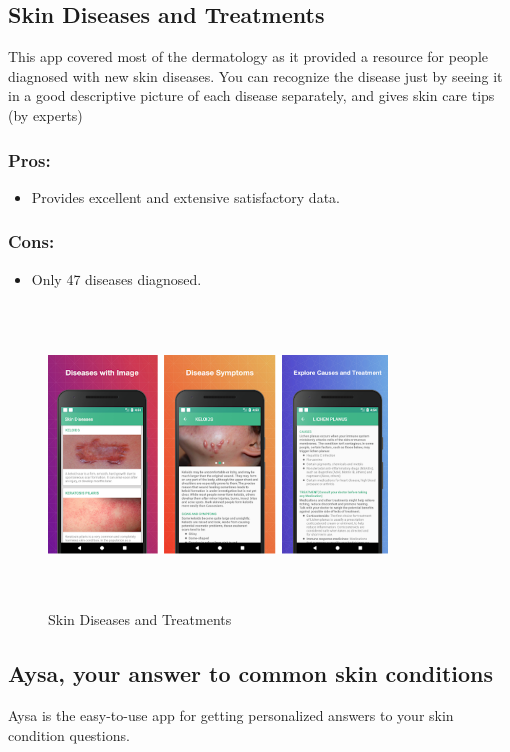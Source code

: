\subsection{Skin Diseases and Treatments}
This app covered most of the dermatology as it provided a resource for people diagnosed with new skin diseases. You can recognize the disease just by seeing it in a good descriptive picture of each disease separately, and gives skin care tips (by experts)
 \subsubsection{Pros:}
 \begin{itemize}
     \item Provides excellent and extensive satisfactory data.\\
 \end{itemize}
\subsubsection{Cons:}
\begin{itemize}
     \item Only 47 diseases diagnosed.\\
\end{itemize}

\begin{figure}[H]
 \centering 
 \includegraphics[height= 8cm, width=9cm]{backmatter/figures/SkinDandTreatment.PNG}
 \caption{Skin Diseases and Treatments}
 \end{figure}
 
\subsection{Aysa, your answer to common skin conditions}
Aysa is the easy-to-use app for getting personalized answers to your skin condition questions.\\

